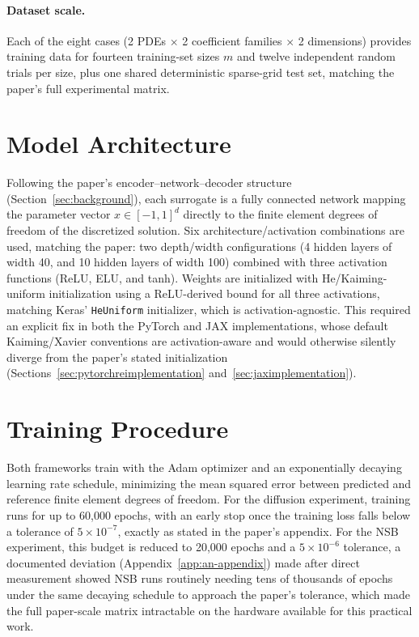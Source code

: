 \paragraph{Dataset scale.} Each of the eight cases (2 PDEs $\times$ 2
coefficient families $\times$ 2 dimensions) provides training data for
fourteen training-set sizes $m$ and twelve independent random trials per
size, plus one shared deterministic sparse-grid test set, matching the
paper's full experimental matrix.

\section{Model Architecture}

Following the paper's encoder--network--decoder structure
(Section~\ref{sec:background}), each surrogate is a fully connected
network mapping the parameter vector $x \in [-1,1]^d$ directly to the
finite element degrees of freedom of the discretized solution. Six
architecture/activation combinations are used, matching the paper: two
depth/width configurations (4 hidden layers of width 40, and 10 hidden
layers of width 100) combined with three activation functions (ReLU, ELU,
and tanh). Weights are initialized with He/Kaiming-uniform initialization
\cite{he2015delving} using a ReLU-derived bound for all three activations,
matching Keras' \texttt{HeUniform} initializer, which is activation-agnostic.
This required an explicit fix in both the PyTorch and JAX implementations,
whose default Kaiming/Xavier conventions are activation-aware and would
otherwise silently diverge from the paper's stated initialization
(Sections~\ref{sec:pytorchreimplementation} and~\ref{sec:jaximplementation}).

\section{Training Procedure}

Both frameworks train with the Adam optimizer \cite{kingma2015adam} and an
exponentially decaying learning rate schedule, minimizing the mean squared
error between predicted and reference finite element degrees of freedom.
For the diffusion experiment, training runs for up to 60{,}000 epochs, with
an early stop once the training loss falls below a tolerance of
$5 \times 10^{-7}$, exactly as stated in the paper's appendix. For the NSB
experiment, this budget is reduced to 20{,}000 epochs and a
$5 \times 10^{-6}$ tolerance, a documented deviation
(Appendix~\ref{app:an-appendix}) made after direct measurement showed NSB
runs routinely needing tens of thousands of epochs under the same decaying
schedule to approach the paper's tolerance, which made the full paper-scale
matrix intractable on the hardware available for this practical work.

